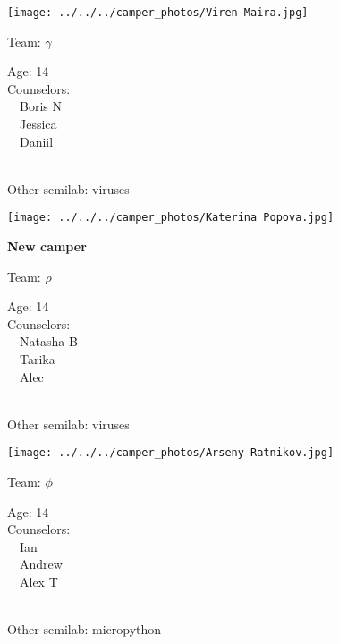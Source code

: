 \documentclass[10pt,letterpaper, landscape]{article}
\begin{document}
\horizontalshiftfornextsticker
\renewcommand{\baselinestretch}{1} \begin{sticker}
\noindent\begin{minipage}{0.5\textwidth}\texttt{[image: ../../../camper\_photos/Viren Maira.jpg]}\end{minipage}\begin{minipage}{0.45\textwidth}
Team: {\Large $\gamma$}

Age:        14\\
Counselors: \\\ \ Boris N\\\ \ Jessica\\\ \ Daniil\\
\end{minipage} \\ \vspace{0.07in}
Other semilab: viruses
\end{sticker}
\horizontalshiftfornextsticker
\renewcommand{\baselinestretch}{1} \begin{sticker}
\noindent\begin{minipage}{0.5\textwidth}\texttt{[image: ../../../camper\_photos/Katerina Popova.jpg]}\end{minipage}\begin{minipage}{0.45\textwidth}
\textbf{New camper} 

Team: {\Large $\rho$}

Age:        14\\
Counselors: \\\ \ Natasha B\\\ \ Tarika\\\ \ Alec\\
\end{minipage} \\ \vspace{0.07in}
Other semilab: viruses
\end{sticker}
\verticalshiftfornextsticker
\renewcommand{\baselinestretch}{1} \begin{sticker}
\noindent\begin{minipage}{0.5\textwidth}\texttt{[image: ../../../camper\_photos/Arseny Ratnikov.jpg]}\end{minipage}\begin{minipage}{0.45\textwidth}
Team: {\Large $\phi$}

Age:        14\\
Counselors: \\\ \ Ian\\\ \ Andrew\\\ \ Alex T\\
\end{minipage} \\ \vspace{0.07in}
Other semilab: micropython
\end{sticker}
\end{document}
